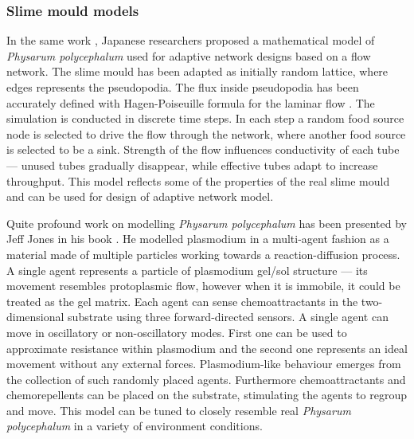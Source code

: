 \documentclass[english,a4paper,twoside]{ppfcmthesis}
\begin{document}
\subsubsection{Slime mould models}

In the same work \cite{tero2010rules}, Japanese researchers proposed a mathematical model of \textit{Physarum polycephalum} used for adaptive network designs based on a flow network. The slime mould has been adapted as initially random lattice, where edges represents the pseudopodia. The flux inside pseudopodia has been accurately defined with Hagen-Poiseuille formula for the laminar flow \cite{sutera1993history}. The simulation is conducted in discrete time steps. In each step a random food source node is selected to drive the flow through the network, where another food source is selected to be a sink. Strength of the flow influences conductivity of each tube --- unused tubes gradually disappear, while effective tubes adapt to increase throughput. This model reflects some of the properties of the real slime mould and can be used for design of adaptive network model.

Quite profound work on modelling \textit{Physarum polycephalum} has been presented by Jeff Jones in his book \cite{jones2015pattern}. He modelled plasmodium in a multi-agent fashion as a material made of multiple particles working towards a reaction-diffusion process. A single agent represents a particle of plasmodium gel/sol structure --- its movement resembles protoplasmic flow, however when it is immobile, it could be treated as the gel matrix. Each agent can sense chemoattractants in the two-dimensional substrate using three forward-directed sensors. A single agent can move in oscillatory or non-oscillatory modes. First one can be used to approximate resistance within plasmodium and the second one represents an ideal movement without any external forces. Plasmodium-like behaviour emerges from the collection of such randomly placed agents. Furthermore chemoattractants and chemorepellents can be placed on the substrate, stimulating the agents to regroup and move. This model can be tuned to closely resemble real \textit{Physarum polycephalum} in a variety of environment conditions.
\end{document}
